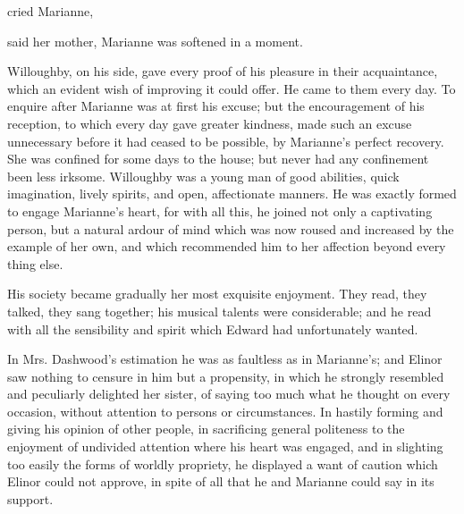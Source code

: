  cried Marianne, 

 said her mother,  Marianne was softened in a moment.

Willoughby, on his side, gave every proof of his pleasure in their acquaintance, which an evident wish of improving it could offer. He came to them every day. To enquire after Marianne was at first his excuse; but the encouragement of his reception, to which every day gave greater kindness, made such an excuse unnecessary before it had ceased to be possible, by Marianne's perfect recovery. She was confined for some days to the house; but never had any confinement been less irksome. Willoughby was a young man of good abilities, quick imagination, lively spirits, and open, affectionate manners. He was exactly formed to engage Marianne's heart, for with all this, he joined not only a captivating person, but a natural ardour of mind which was now roused and increased by the example of her own, and which recommended him to her affection beyond every thing else.

His society became gradually her most exquisite enjoyment. They read, they talked, they sang together; his musical talents were considerable; and he read with all the sensibility and spirit which Edward had unfortunately wanted.

In Mrs. Dashwood's estimation he was as faultless as in Marianne's; and Elinor saw nothing to censure in him but a propensity, in which he strongly resembled and peculiarly delighted her sister, of saying too much what he thought on every occasion, without attention to persons or circumstances. In hastily forming and giving his opinion of other people, in sacrificing general politeness to the enjoyment of undivided attention where his heart was engaged, and in slighting too easily the forms of worldly propriety, he displayed a want of caution which Elinor could not approve, in spite of all that he and Marianne could say in its support.

